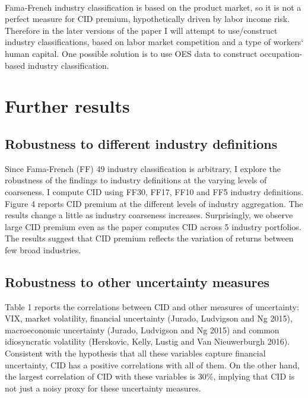 \documentclass[12pt]{article}
\begin{document}
\paragraph{}
Fama-French industry classification is based on the product market, so it is not a perfect measure for CID premium, hypothetically driven by labor income risk. Therefore in the later versions of the paper I will attempt to use/construct industry classifications, based on labor market competition and a type of workers` human capital. One possible solution is to use OES data to construct occupation-based industry classification.


\section{Further results} \label{sec:Model}
\subsection{Robustness to different industry definitions}

Since Fama-French (FF) 49 industry classification is arbitrary, I explore the robustness of the findings to industry definitions at the varying levels of coarseness. I compute CID using FF30, FF17, FF10 and FF5 industry definitions. Figure 4 reports CID premium at the different levels of industry aggregation. The results change a little as industry coarseness increases. Surprisingly, we observe large CID premium even as the paper computes CID across 5 industry portfolios. The results suggest that CID premium reflects the variation of returns between few broad industries.  

\subsection{Robustness to other uncertainty measures}

Table 1 reports the correlations between CID and other measures of uncertainty: VIX, market volatility, financial uncertainty (Jurado, Ludvigson and Ng 2015), macroeconomic uncertainty (Jurado, Ludvigson and Ng 2015) and common idiosyncratic volatility (Herskovic, Kelly, Lustig and Van Nieuwerburgh 2016). Consistent with the hypothesis that all these variables capture financial uncertainty, CID has a positive correlations with all of them. On the other hand, the largest correlation of CID with these variables is 30\%, implying that CID is not just a noisy proxy for these uncertainty measures.
\end{document}
